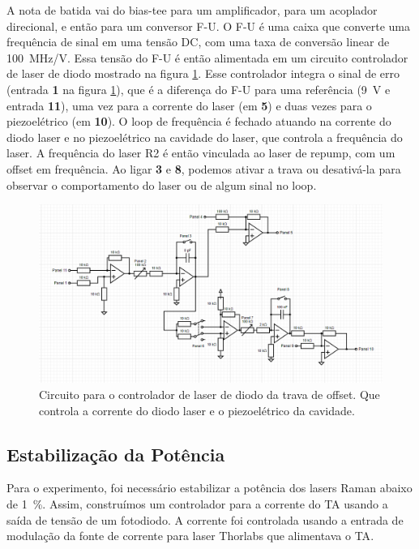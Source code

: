 A nota de batida vai do bias-tee para um amplificador, para um acoplador direcional, e então para um conversor F-U. O F-U é uma caixa que converte uma frequência de sinal em uma tensão DC, com uma taxa de conversão linear de \SI{100}{MHz/V}. 
Essa tensão do F-U é então alimentada em um circuito controlador de laser de diodo mostrado na figura \ref{fig:lock_circuit}. 
Esse controlador integra o sinal de erro (entrada \textbf{1} na figura \ref{fig:lock_circuit}), que é a diferença do F-U para uma referência (\SI{9}{V} e entrada \textbf{11}), uma vez para a corrente do laser (em \textbf{5}) e duas vezes para o piezoelétrico (em \textbf{10}).
O loop de frequência é fechado atuando na corrente do diodo laser e no piezoelétrico na cavidade do laser, que controla a frequência do laser. A frequência do laser R2 é então vinculada ao laser de repump, com um offset em frequência. Ao ligar \textbf{3} e \textbf{8}, podemos ativar a trava ou desativá-la para observar o comportamento do laser ou de algum sinal no loop.

\begin{figure}
    \centering
    \includegraphics[width=0.9\linewidth]{figures/lock_circuit.png}
    \caption{Circuito para o controlador de laser de diodo da trava de offset. Que controla a corrente do diodo laser e o piezoelétrico da cavidade.}
    \label{fig:lock_circuit}
\end{figure}


\subsection{Estabilização da Potência}
Para o experimento, foi necessário estabilizar a potência dos lasers Raman abaixo de \SI{1}{\percent}. Assim, construímos um controlador para a corrente do \gls{TA} usando a saída de tensão de um fotodiodo. A corrente foi controlada usando a entrada de modulação da fonte de corrente para laser Thorlabs que alimentava o \gls{TA}.

